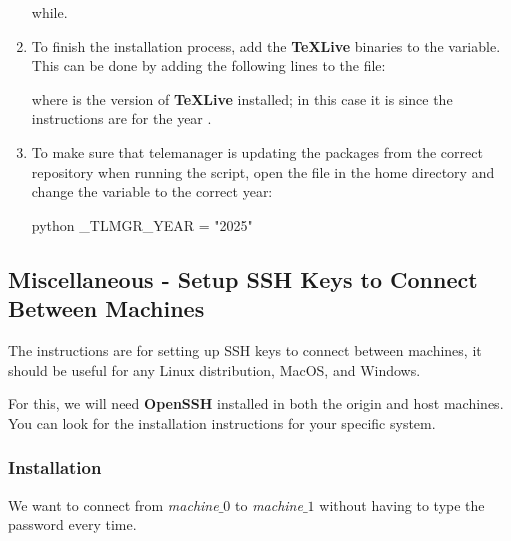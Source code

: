 \begin{enumerate}
    while.
    \item To finish the installation process, add the \textbf{TeXLive} binaries to the
     variable. This can be done by adding the following lines to the
     file:
    where  is the version of \textbf{TeXLive} installed; in this case it
    is  since the instructions are for the year .
    \item To make sure that telemanager is updating the packages from the correct repository when
    running the  script, open the  file in the home directory
    and change the variable  to the correct year:
    \begin{mintedbox}{python}
_TLMGR_YEAR = "2025"
    \end{mintedbox}
\end{enumerate}


\subsection{Miscellaneous - Setup SSH Keys to Connect Between Machines}

The instructions are for setting up SSH keys to connect between machines, it should be useful for
any Linux distribution, MacOS, and Windows.\bigbreak

For this, we will need \textbf{OpenSSH} installed in both the origin and host machines. You can look
for the installation instructions for your specific system.

\subsubsection{Installation}

We want to connect from \textit{machine$\_0$} to \textit{machine$\_1$} without having to type
the password every time.\bigbreak

